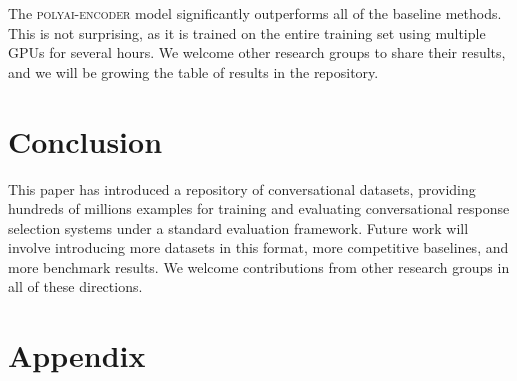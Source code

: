 \documentclass[11pt,a4paper,table]{article}
\newcommand\encoder{polyai-encoder}
\newcommand\encoder{encoder}
\begin{document}
The \textsc{\encoder} model significantly outperforms all of the baseline methods. This is not surprising, as it is trained on the entire training set using multiple GPUs for several hours. We welcome other research groups to share their results, and we will be growing the table of results in the repository.

\section{Conclusion}

This paper has introduced a repository of conversational datasets, providing hundreds of millions examples for training and evaluating conversational response selection systems under a standard evaluation framework. Future work will involve introducing more datasets in this format, more competitive baselines, and more benchmark results. We welcome contributions from other research groups in all of these directions.  


  


\cleardoublepage
\onecolumn
\appendix

\section{Appendix} \label{app:examples}
\end{document}
